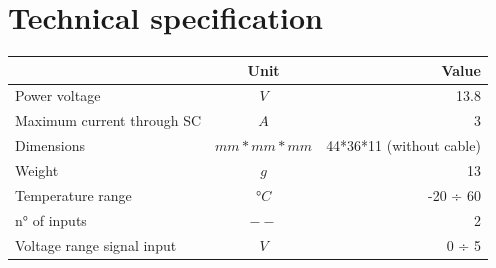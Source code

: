 \documentclass[a4paper,12pt,oneside,pdflatex,italian,final]{article}
\begin{document}
\section{Technical specification}
\centering
\begin{tabular}{lcr}
\toprule
 & Unit & Value \\
\midrule
Power voltage & $V$ & 13.8 \\
Maximum current  through SC & $A$ & 3 \\
Dimensions & $mm*mm*mm$ & 44*36*11 (without cable) \\
Weight & $g$ & 13 \\
Temperature range & $°C$ & -20 ÷ 60\\
n° of inputs & $--$ & 2 \\
Voltage range signal input & $V$ & 0 ÷ 5 \\
\bottomrule
\end{tabular}
\end{document}
